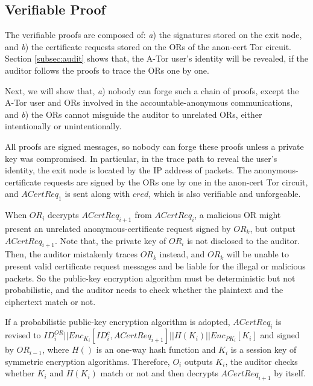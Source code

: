 \subsection{Verifiable Proof}
The verifiable proofs are composed of:
    \emph{a}) the signatures stored on the exit node,
    and \emph{b}) the certificate requests stored on the ORs of the anon-cert Tor circuit.
Section \ref{subsec:audit} shows that,
    the A-Tor user's identity will be revealed, if the auditor follows the proofs to trace the ORs one by one.

Next, we will show that,
   \emph{a}) nobody can forge such a chain of proofs, except the A-Tor user and ORs
            involved in the accountable-anonymous communications,
    and   \emph{b}) the ORs cannot misguide the auditor to unrelated ORs, either intentionally or unintentionally.

All proofs are signed messages, so nobody can forge these proofs unless a private key was compromised.
In particular,
  in the trace path to reveal the user's identity,
   the exit node is located by the IP address of packets.
The anonymous-certificate requests are signed by the ORs one by one in the anon-cert Tor circuit,
and $ACertReq_1$ is sent along with $cred$, which is also verifiable and unforgeable.


When $OR_i$ decrypts $ACertReq_{i+1}$ from $ACertReq_{i}$,
 a malicious OR might present an unrelated anonymous-certificate request signed by $OR_k$,
    but output $ACertReq_{i+1}$.
Note that, the private key of $OR_i$ is not disclosed to the auditor.
Then, the auditor mistakenly traces $OR_k$ instead,
  and $OR_k$ will be unable to present valid certificate request messages
   and be liable for the illegal or malicious packets.
So
    the public-key encryption algorithm  must be deterministic but not probabilistic,
    and the auditor needs to check whether the plaintext and the ciphertext match or not.

If a probabilistic public-key encryption algorithm is adopted,
    $ACertReq_{i}$ is revised to
        $ID^{OR}_i || Enc_{K_i}[ID^c_i, ACertReq_{i+1}] || H(K_i) || Enc_{PK_i}[K_i]$ and signed by $OR_{i-1}$,
    where $H()$ is an one-way hash function and $K_i$ is a session key of symmetric encryption algorithms.
Therefore, $O_i$ outputs $K_i$,
     the auditor checks whether $K_i$ and $H(K_i)$ match or not and then decrypts $ACertReq_{i+1}$ by itself.



